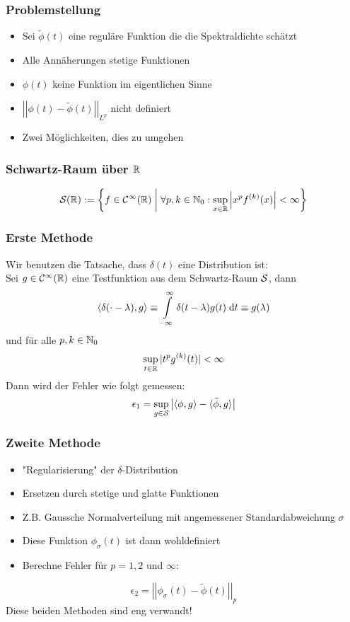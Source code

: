 \begin{frame}
    \frametitle{Problemstellung}
    \begin{itemize}
        \item Sei $\tilde{\phi}(t)$ eine reguläre Funktion die die Spektraldichte schätzt
        \item Alle Annäherungen stetige Funktionen
        \item $\phi(t)$ keine Funktion im eigentlichen Sinne
        \item $\left|\left|\phi(t) - \tilde{\phi}(t)\right|\right|_{L^p}$ nicht definiert
        \item Zwei Möglichkeiten, dies zu umgehen
    \end{itemize}
\end{frame}

\begin{frame}
    \frametitle{Schwartz-Raum über $\mathbb{R}$}
    $$\mathcal{S}(\mathbb{R}) := \left\{f \in \mathcal{C}^{\infty}(\mathbb{R}) \;\middle|\; \forall p, k \in \mathbb{N}_0: \sup_{x \in \mathbb{R}} \left| x^pf^{(k)}(x)\right| < \infty \right\}$$
\end{frame}

\begin{frame}
    \frametitle{Erste Methode}
    Wir benutzen die Tatsache, dass $\delta(t)$ eine Distribution ist:\\
    Sei $g \in \mathcal{C}^{\infty}(\mathbb{R})$ eine Testfunktion aus dem Schwartz-Raum $\mathcal{S}$, dann
    $$\langle \delta(\cdot - \lambda), g \rangle \equiv \int\limits_{-\infty}^{\infty} \delta(t - \lambda) g(t) \;\mathrm{d}t \equiv g(\lambda)$$
    und für alle $p, k \in \mathbb{N}_0$
    $$\sup_{t \in \mathbb{R}} |t^pg^{(k)}(t)| < \infty$$
    Dann wird der Fehler wie folgt gemessen:
    $$\epsilon_1 = \sup_{g \in \mathcal{S}} \left| \langle \phi, g \rangle - \langle \tilde{\phi}, g \rangle \right|$$
\end{frame}

\begin{frame}
    \frametitle{Zweite Methode}
    \begin{itemize}
        \item "Regularisierung" der $\delta$-Distribution\\
        \item Ersetzen durch stetige und glatte Funktionen\\
        \item Z.B. Gaussche Normalverteilung mit angemessener Standardabweichung $\sigma$\\
        \item Diese Funktion $\phi_{\sigma}(t)$ ist dann wohldefiniert\\
        \item Berechne Fehler für $p=1, 2$ und $\infty$:
    \end{itemize}
    \vspace{3mm}
    $$\epsilon_2 = \left|\left| \phi_{\sigma}(t) - \tilde{\phi}(t) \right|\right|_p$$
    \vspace{7mm}
    Diese beiden Methoden sind eng verwandt!
\end{frame}

